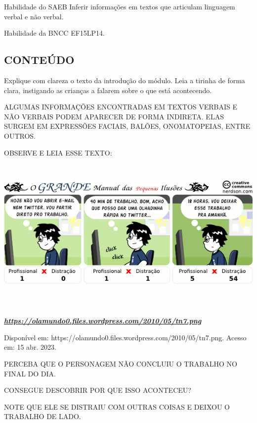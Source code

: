 \protect\hypertarget{_heading=h.3c1jaqhv8nr}{}{}

\protect\hypertarget{_heading=h.kyrxefm3laa1}{}{}Habilidade do SAEB
Inferir informações em textos que articulam linguagem verbal e não verbal.

\protect\hypertarget{_heading=h.69rmtrb8c7jb}{}{}

\protect\hypertarget{_heading=h.23ckvvd}{}{}Habilidade da BNCC
EF15LP14.

\subsection{CONTEÚDO}\label{conteuxfado-6}

Explique com clareza o texto da introdução do módulo. Leia a tirinha de
forma clara, instigando as crianças a falarem sobre o que está acontecendo.

ALGUMAS INFORMAÇÕES ENCONTRADAS EM TEXTOS VERBAIS E NÃO VERBAIS PODEM APARECER DE FORMA INDIRETA. ELAS SURGEM EM EXPRESSÕES FACIAIS, BALÕES, ONOMATOPEIAS, ENTRE OUTROS.

OBSERVE E LEIA ESSE TEXTO:
\includegraphics[width=6.51667in,height=3.14097in]{media/image170.png}

\href{https://olamundo0.files.wordpress.com/2010/05/tn7.png}{\textbf{\emph{https://olamundo0.files.wordpress.com/2010/05/tn7.png}}}

Disponível em: https://olamundo0.files.wordpress.com/2010/05/tn7.png. Acesso em: 15 abr. 2023.

PERCEBA QUE O PERSONAGEM NÃO CONCLUIU O TRABALHO NO FINAL DO
DIA.

CONSEGUE DESCOBRIR POR QUE ISSO ACONTECEU?

NOTE QUE ELE SE DISTRAIU COM OUTRAS COISAS E DEIXOU O TRABALHO DE LADO.


